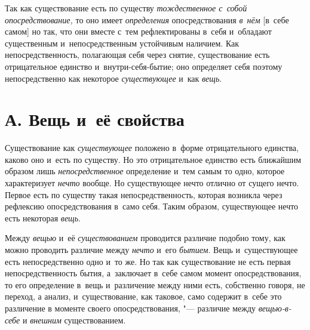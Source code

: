 Так как существование есть по существу
{\em тождественное с~собой опосредствование,} то оно
имеет {\em определения} опосредствования
{\em в~нём} [в~себе самом] но так, что они вместе с~тем
рефлектированы в~себя и~обладают существенным и~непосредственным устойчивым
наличием. Как непосредственность, полагающая себя через снятие,
существование есть отрицательное единство и~внутри-себя-бытие; оно
определяет себя поэтому непосредственно как некоторое
{\em существующее} и~как
{\em вещь}.


\section[А. Вещь и~её свойства]{А. Вещь и~её свойства}

Существование как {\em существующее} положено в~форме отрицательного
единства, каково оно и~есть по существу. Но это отрицательное единство есть
ближайшим образом лишь {\em непосредственное}
определение и~тем самым то одно, которое характеризует
{\em нечто} вообще. Но существующее нечто отлично от
сущего нечто. Первое есть по существу такая непосредственность, которая
возникла через рефлексию опосредствования в~само себя. Таким образом,
существующее нечто есть некоторая {\em вещь}.

Между {\em вещью} и~её
{\em существованием} проводится различие подобно тому,
как можно проводить различие между {\em нечто} и~его
{\em бытием}. Вещь и~существующее есть непосредственно
одно и~то же. Но так как существование не есть первая непосредственность
бытия, а~заключает в~себе самом момент опосредствования, то его определение
в~вещь и~различение между ними есть, собственно говоря, не переход, а
анализ, и~существование, как таковое, само содержит в~себе это различение в
моменте своего опосредствования, "--- различие между
{\em вещью-в-себе} и {\em внешним} существованием.



